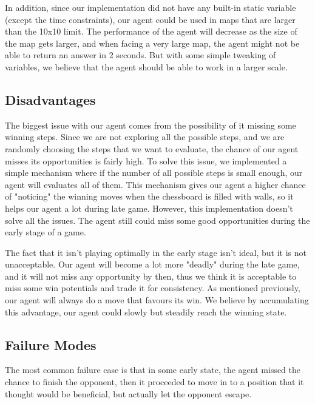 \documentclass[twoside,11pt]{article}
\begin{document}
In addition, since our implementation did not have any built-in static variable (except the time constraints), our agent could be used in maps that are larger than the 10x10 limit. 
The performance of the agent will decrease as the size of the map gets larger, and when facing a very large map, the agent might not be able to return an answer in 2 seconds.
But with some simple tweaking of variables, we believe that the agent should be able to work in a larger scale.

\subsection{Disadvantages}
The biggest issue with our agent comes from the possibility of it missing some winning steps.
Since we are not exploring all the possible steps, and we are randomly choosing the steps that we want to evaluate, the chance of our agent misses its opportunities is fairly high.
To solve this issue, we implemented a simple mechanism where if the number of all possible steps is small enough, our agent will evaluates all of them.
This mechanism gives our agent a higher chance of "noticing" the winning moves when the chessboard is filled with walls, so it helps our agent a lot during late game. 
However, this implementation doesn't solve all the issues. 
The agent still could miss some good opportunities during the early stage of a game.

The fact that it isn't playing optimally in the early stage isn't ideal, but it is not unacceptable.
Our agent will become a lot more "deadly" during the late game, and it will not miss any opportunity by then, thus we think it is acceptable to miss some win potentials and trade it for consistency. 
As mentioned previously, our agent will always do a move that favours its win.
We believe by accumulating this advantage, our agent could slowly but steadily reach the winning state.

\subsection{Failure Modes}
The most common failure case is that in some early state, the agent missed the chance to finish the opponent, then it proceeded to move in to a position that it thought would be beneficial, but actually let the opponent escape.
\end{document}
